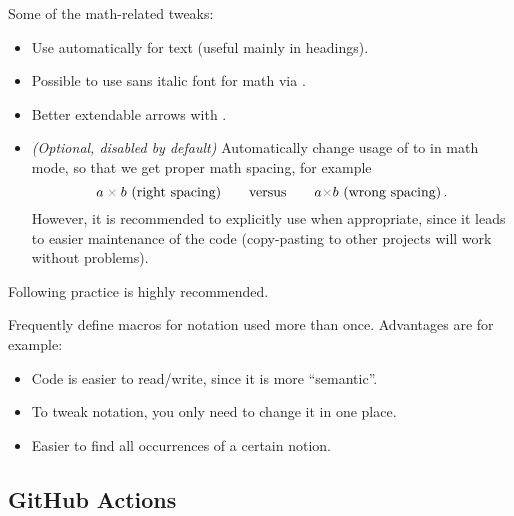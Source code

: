 Some of the math-related tweaks:
\begin{itemize}
    \item Use \macro{\boldmath} automatically for \macro{\textbf} text (useful mainly in headings).
    \item Possible to use sans italic font for math via \custommacro{\mathsfit}.
    \item Better extendable arrows with .
    \item \emph{(Optional, disabled by default)} Automatically change usage of \macro{\textcolor} to \macro{\mathcolor} in math mode, so that we get proper math spacing, for example
          \[ a \mathcolor{gray}{\times} b \text{ (right spacing)} \qquad\text{versus}\qquad a \textcolor{gray}{\times} b \text{ (wrong spacing)}\eqend \]
          However, it is recommended to explicitly use \macro{\mathcolor} when appropriate, since it leads to easier maintenance of the code (copy-pasting to other projects will work without problems).
\end{itemize}

\vspace{1ex}
Following practice is highly recommended.
\begin{tip}
    Frequently define macros for notation used more than once. Advantages are for example:
    \begin{itemize}
        \item Code is easier to read/write, since it is more \enquote{semantic}.
        \item To tweak notation, you only need to change it in one place.
        \item Easier to find all occurrences of a certain notion. \qedhere
    \end{itemize}
\end{tip}

\subsection{GitHub Actions}%
\label{sub:GitHub Actions}

